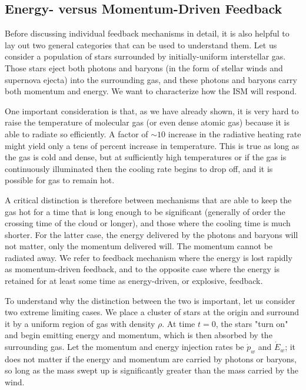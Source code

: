 \subsection{Energy- versus Momentum-Driven Feedback}

Before discussing individual feedback mechanisms in detail, it is also helpful to lay out two general categories that can be used to understand them. Let us consider a population of stars surrounded by initially-uniform interstellar gas. Those stars eject both photons and baryons (in the form of stellar winds and supernova ejecta) into the surrounding gas, and these photons and baryons carry both momentum and energy. We want to characterize how the ISM will respond.

One important consideration is that, as we have already shown, it is very hard to raise the temperature of molecular gas (or even dense atomic gas) because it is able to radiate so efficiently. A factor of $\sim 10$ increase in the radiative heating rate might yield only a tens of percent increase in temperature. This is true as long as the gas is cold and dense, but at sufficiently high temperatures or if the gas is continuously illuminated then the cooling rate begins to drop off, and it is possible for gas to remain hot.

A critical distinction is therefore between mechanisms that are able to keep the gas hot for a time that is long enough to be significant (generally of order the crossing time of the cloud or longer), and those where the cooling time is much shorter. For the latter case, the energy delivered by the photons and baryons will not matter, only the momentum delivered will. The momentum cannot be radiated away. We refer to feedback mechanism where the energy is lost rapidly as momentum-driven feedback, and to the opposite case where the energy is retained for at least some time as energy-driven, or explosive, feedback.

To understand why the distinction between the two is important, let us consider two extreme limiting cases. We place a cluster of stars at the origin and surround it by a uniform region of gas with density $\rho$. At time $t=0$, the stars "turn on" and begin emitting energy and momentum, which is then absorbed by the surrounding gas. Let the momentum and energy injection rates be $\dot{p}_w$ and $\dot{E}_w$; it does not matter if the energy and momentum are carried by photons or baryons, so long as the mass swept up is significantly greater than the mass carried by the wind.

